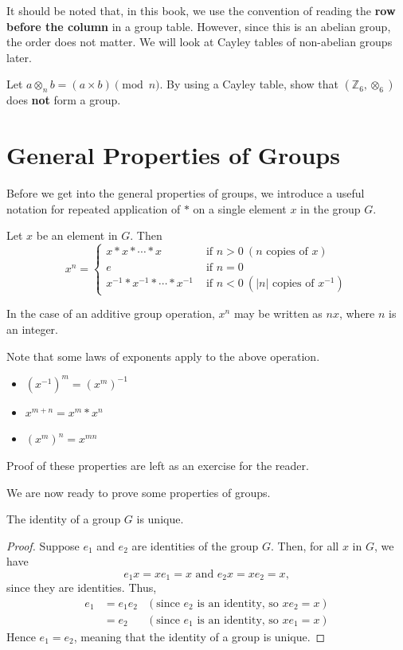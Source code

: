 It should be noted that, in this book, we use the convention of reading the \textbf{row before the column} in a group table. However, since this is an abelian group, the order does not matter. We will look at Cayley tables of non-abelian groups later.

\begin{exercise}
    Let $a \otimes_n b = (a \times b) \pmod{n}$. By using a Cayley table, show that $(\mathbb{Z}_6, \otimes_6)$ does \textbf{not} form a group.
\end{exercise}

\section{General Properties of Groups}
Before we get into the general properties of groups, we introduce a useful notation for repeated application of $\ast$ on a single element $x$ in the group $G$.
\begin{definition}
    Let $x$ be an element in $G$. Then
    \[
        x^n =
        \begin{cases}
            x\ast x\ast \cdots \ast x & \text{ if } n > 0 \ (n\text{ copies of }x)\\
            e & \text{ if } n=0 \\
            x^{-1}\ast x^{-1}\ast \cdots \ast x^{-1} & \text{ if } n<0 \ (|n|\text{ copies of }x^{-1})
        \end{cases}
    \]
\end{definition}
\begin{remark}
    In the case of an additive group operation, $x^n$ may be written as $nx$, where $n$ is an integer.
\end{remark}

Note that some laws of exponents apply to the above operation.
\begin{itemize}
    \item $\left(x^{-1}\right)^m = \left(x^m\right)^{-1}$
    \item $x^{m+n} = x^m \ast x^n$
    \item $\left(x^m\right)^n = x^{mn}$
\end{itemize}
Proof of these properties are left as an exercise for the reader.

We are now ready to prove some properties of groups.
\begin{proposition}
    The identity of a group $G$ is unique.
\end{proposition}
\begin{proof}
    Suppose $e_1$ and $e_2$ are identities of the group $G$. Then, for all $x$ in $G$, we have
    \[
        e_1x = xe_1 = x \text{ and } e_2x = xe_2 = x,
    \]
    since they are identities. Thus,
    \begin{align*}
        e_1 &= e_1e_2 & (\text{since } e_2 \text{ is an identity, so } xe_2 = x)\\
        &= e_2 & (\text{since } e_1 \text{ is an identity, so } xe_1 = x)
    \end{align*}
    Hence $e_1 = e_2$, meaning that the identity of a group is unique.
\end{proof}

